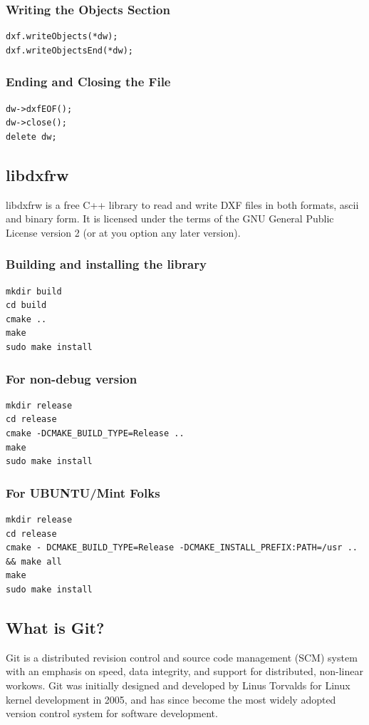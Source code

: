 \subsubsection{Writing the Objects Section}
\begin{verbatim}
dxf.writeObjects(*dw);
dxf.writeObjectsEnd(*dw);
\end{verbatim}
\subsubsection{Ending and Closing the File}
\begin{verbatim}
dw->dxfEOF();
dw->close();
delete dw;
\end{verbatim}

\subsection{libdxfrw}
\noindent libdxfrw is a free C++ library to read and write DXF files in both formats, ascii and binary form. It is licensed under the terms of the GNU General Public License version 2 (or at you option any later version).
\subsubsection*{Building and installing the library}
\begin{verbatim}
mkdir build
cd build
cmake ..
make
sudo make install
\end{verbatim}
\subsubsection*{For non-debug version}
\begin{verbatim}
mkdir release
cd release
cmake -DCMAKE_BUILD_TYPE=Release ..
make
sudo make install
\end{verbatim}
\subsubsection*{For UBUNTU/Mint Folks}
\begin{verbatim}
mkdir release
cd release
cmake - DCMAKE_BUILD_TYPE=Release -DCMAKE_INSTALL_PREFIX:PATH=/usr .. && make all
make
sudo make install
\end{verbatim}

\subsection{What is Git?}
Git is a distributed revision control and source code management (SCM) system with an emphasis on speed, data integrity, and support for distributed, non-linear workows. Git was initially designed and developed by Linus Torvalds for Linux  kernel development in 2005,  and has  since become the most widely adopted version   control   system  for software development.

